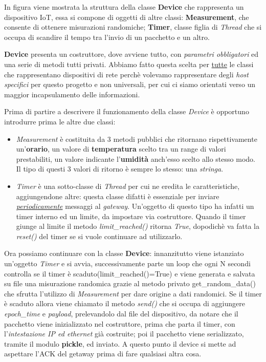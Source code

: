 \documentclass[a4paper,12pt]{report}
\begin{document}
In figura viene mostrata la struttura della classe \textbf{Device} che rappresenta un dispositivo IoT, essa si compone di oggetti di altre classi: \textbf{Measurement}, che consente di ottenere misurazioni randomiche; \textbf{Timer}, classe figlia di \emph{Thread} che si occupa di scandire il tempo tra l'invio di un pacchetto e un altro.

\textbf{Device} presenta un costruttore, dove avviene tutto, con \emph{parametri obbligatori} ed una serie di metodi tutti privati.
%
Abbiamo fatto questa scelta per \underline{tutte} le classi che rappresentano dispositivi di rete perchè volevamo rappresentare degli \emph{host specifici} per questo progetto e non universali, per cui ci siamo orientati verso un maggior incapsulamento delle informazioni.

Prima di partire a descrivere il funzionamento della classe \emph{Device} è opportuno introdurre prima le altre due classi:
%
\begin{itemize}
\item \emph{Measurement} è costituita da 3 metodi pubblici che ritornano rispettivamente un'\textbf{orario}, un valore di \textbf{temperatura} scelto tra un range di valori prestabiliti, un valore indicante l'\textbf{umidità} anch'esso scelto allo stesso modo. Il tipo di questi 3 valori di ritorno è sempre lo stesso: una \emph{stringa}.

\item \emph{Timer} è una sotto-classe di \emph{Thread} per cui ne eredita le caratteristiche, aggiungendone altre: questa classe difatti è essenziale per inviare \underline{\emph{periodicamente}} messaggi al \emph{gateway}. Un'oggetto di questo tipo ha infatti un timer interno ed un limite, da impostare via costruttore. Quando il timer giunge al limite il metodo \emph{limit\_reached()} ritorna \emph{True}, dopodichè va fatta la \emph{reset()} del timer se si vuole continuare ad utilizzarlo.
\end{itemize}

Ora possiamo continuare con la classe \textbf{Device}: innanzitutto viene istanziato un'oggetto \emph{Timer} e si avvia, successivamente parte un loop che ogni N secondi controlla se il timer è scaduto(limit\_reached()=True) e viene generata e salvata su file una misurazione randomica grazie al metodo privato get\_random\_data() che sfrutta l'utilizzo di \emph{Measurement} per dare origine a dati randomici.
%
Se il timer è scaduto allora viene chiamato il metodo \emph{send()} che si occupa di aggiungere \emph{epoch\_time} e \emph{payload}, prelevandolo dal file del dispositivo, da notare che il pacchetto viene inizializzato nel costruttore, prima che parta il timer, con l'\emph{intestazione IP ed ethernet} già costruite; poi il pacchetto viene serializzato, tramite il modulo \textbf{pickle}, ed inviato. 
%
A questo punto il device si mette ad aspettare l'ACK del getaway prima di fare qualsiasi altra cosa.
\end{document}
